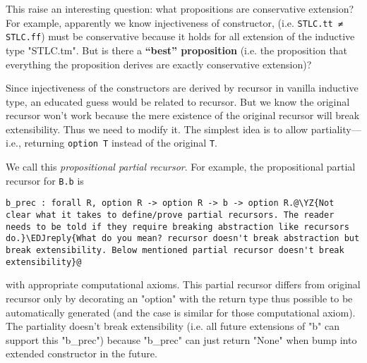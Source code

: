 This raise an interesting question: what propositions are conservative extension? For example, apparently we know injectiveness of constructor, (i.e. \texttt{STLC.tt ≠ STLC.ff}) must be conservative because it holds for all extension of the inductive type "STLC.tm". But is there a \textbf{``best'' proposition} (i.e. the proposition that everything the proposition derives are exactly conservative extension)?

Since injectiveness of the constructors are derived by recursor in vanilla inductive type, an educated guess would be related to recursor. But we know the original recursor won't work because the mere existence of the original recursor will break extensibility. Thus we need to modify it.
The simplest idea is to allow partiality---i.e., returning
\texttt{option T} instead of the original \texttt{T}.

We call this \textit{propositional partial recursor}.
For example, the propositional partial recursor for \texttt{B.b} is

\begin{verbatim}
b_prec : forall R, option R -> option R -> b -> option R.@\YZ{Not clear what it takes to define/prove partial recursors. The reader needs to be told if they require breaking abstraction like recursors do.}\EDJreply{What do you mean? recursor doesn't break abstraction but break extensibility. Below mentioned partial recursor doesn't break extensibility}@
\end{verbatim}
with appropriate computational axioms. This partial recursor differs from original recursor only by decorating an "option" with the return type thus possible to be automatically generated (and the case is similar for those computational axiom). The partiality doesn't break
extensibility (i.e. all future extensions of "b" can support this
"b_prec") because "b_prec" can just return "None" when bump into extended constructor in the future. 

